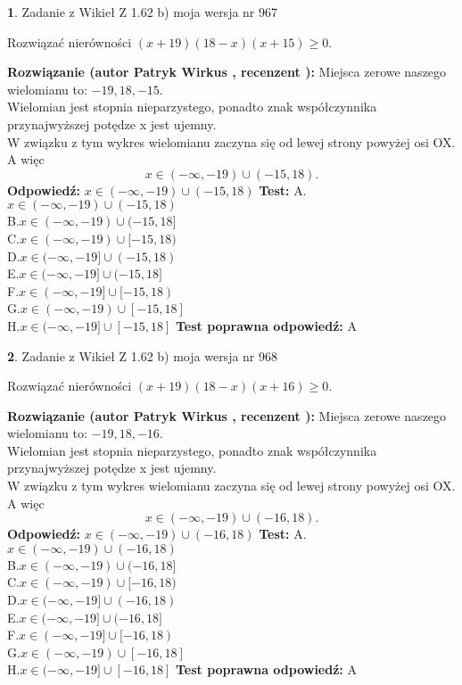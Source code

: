 \documentclass[12pt, a4paper]{article}
\theoremstyle{definition} %
\newtheorem{zad}{}
\newcommand{\zadStart}[1]{\begin{zad}#1\newline}
\newcommand{\zadStop}{\end{zad}}
\newcommand{\rozwStart}[2]{\noindent \textbf{Rozwiązanie (autor #1 , recenzent #2): }\newline}
\newcommand{\rozwStop}{\newline}
\newcommand{\odpStart}{\noindent \textbf{Odpowiedź:}\newline}
\newcommand{\odpStop}{\newline}
\newcommand{\testStart}{\noindent \textbf{Test:}\newline}
\newcommand{\testStop}{\newline}
\newcommand{\kluczStart}{\noindent \textbf{Test poprawna odpowiedź:}\newline}
\newcommand{\kluczStop}{\newline}
\begin{document}
\zadStart{Zadanie z Wikieł Z 1.62 b) moja wersja nr 967}

Rozwiązać nierówności $(x+19)(18-x)(x+15)\ge0$.
\zadStop
\rozwStart{Patryk Wirkus}{}
Miejsca zerowe naszego wielomianu to: $-19, 18, -15$.\\
Wielomian jest stopnia nieparzystego, ponadto znak współczynnika przy\linebreak najwyższej potędze x jest ujemny.\\ W związku z tym wykres wielomianu zaczyna się od lewej strony powyżej osi OX. A więc $$x \in (-\infty,-19) \cup (-15,18).$$
\rozwStop
\odpStart
$x \in (-\infty,-19) \cup (-15,18)$
\odpStop
\testStart
A.$x \in (-\infty,-19) \cup (-15,18)$\\
B.$x \in (-\infty,-19) \cup (-15,18]$\\
C.$x \in (-\infty,-19) \cup [-15,18)$\\
D.$x \in (-\infty,-19] \cup (-15,18)$\\
E.$x \in (-\infty,-19] \cup (-15,18]$\\
F.$x \in (-\infty,-19] \cup [-15,18)$\\
G.$x \in (-\infty,-19) \cup [-15,18]$\\
H.$x \in (-\infty,-19] \cup [-15,18]$
\testStop
\kluczStart
A
\kluczStop



\zadStart{Zadanie z Wikieł Z 1.62 b) moja wersja nr 968}

Rozwiązać nierówności $(x+19)(18-x)(x+16)\ge0$.
\zadStop
\rozwStart{Patryk Wirkus}{}
Miejsca zerowe naszego wielomianu to: $-19, 18, -16$.\\
Wielomian jest stopnia nieparzystego, ponadto znak współczynnika przy\linebreak najwyższej potędze x jest ujemny.\\ W związku z tym wykres wielomianu zaczyna się od lewej strony powyżej osi OX. A więc $$x \in (-\infty,-19) \cup (-16,18).$$
\rozwStop
\odpStart
$x \in (-\infty,-19) \cup (-16,18)$
\odpStop
\testStart
A.$x \in (-\infty,-19) \cup (-16,18)$\\
B.$x \in (-\infty,-19) \cup (-16,18]$\\
C.$x \in (-\infty,-19) \cup [-16,18)$\\
D.$x \in (-\infty,-19] \cup (-16,18)$\\
E.$x \in (-\infty,-19] \cup (-16,18]$\\
F.$x \in (-\infty,-19] \cup [-16,18)$\\
G.$x \in (-\infty,-19) \cup [-16,18]$\\
H.$x \in (-\infty,-19] \cup [-16,18]$
\testStop
\kluczStart
A
\kluczStop
\end{document}
